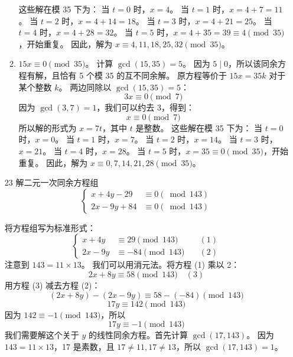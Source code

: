 \begin{enumerate}
\begin{solution}
\begin{enumerate}
            这些解在模 35 下为：
            当 $t=0$ 时，$x = 4$。
            当 $t=1$ 时，$x = 4 + 7 = 11$。
            当 $t=2$ 时，$x = 4 + 14 = 18$。
            当 $t=3$ 时，$x = 4 + 21 = 25$。
            当 $t=4$ 时，$x = 4 + 28 = 32$。
            当 $t=5$ 时，$x = 4 + 35 = 39 \equiv 4 \pmod{35}$，开始重复。
            因此，解为 $x \equiv 4, 11, 18, 25, 32 \pmod{35}$。
            \item $15 x \equiv 0 \pmod{35}$。
            计算 $\gcd(15, 35) = 5$。
            因为 $5 \mid 0$，所以该同余方程有解，且恰有 5 个模 35 的互不同余解。
            原方程等价于 $15x = 35k$ 对于某个整数 $k$。
            两边同除以 $\gcd(15, 35)=5$：
            \[ 3x \equiv 0 \pmod{7} \]
            因为 $\gcd(3, 7) = 1$，我们可以约去 3，得到：
            \[ x \equiv 0 \pmod 7 \]
            所以解的形式为 $x = 7t$，其中 $t$ 是整数。
            这些解在模 35 下为：
            当 $t=0$ 时，$x = 0$。
            当 $t=1$ 时，$x = 7$。
            当 $t=2$ 时，$x = 14$。
            当 $t=3$ 时，$x = 21$。
            当 $t=4$ 时，$x = 28$。
            当 $t=5$ 时，$x = 35 \equiv 0 \pmod{35}$，开始重复。
            因此，解为 $x \equiv 0, 7, 14, 21, 28 \pmod{35}$。
        \end{enumerate}
    \end{solution}
    \item[23] 解二元一次同余方程组
    $$
    \left\{\begin{aligned}
    x+4 y-29 & \equiv 0(\bmod 143) \\
    2 x-9 y+84 & \equiv 0(\bmod 143)
    \end{aligned}\right.
    $$
    \begin{solution}
        将方程组写为标准形式：
        $$
        \left\{\begin{aligned}
        x+4 y & \equiv 29 \pmod{143} \quad &(1) \\
        2 x-9 y & \equiv -84 \pmod{143} \quad &(2)
        \end{aligned}\right.
        $$
        注意到 $143 = 11 \times 13$。
        我们可以用消元法。将方程 (1) 乘以 2：
        \[ 2x + 8y \equiv 58 \pmod{143} \quad (3) \]
        用方程 (3) 减去方程 (2)：
        \[ (2x + 8y) - (2x - 9y) \equiv 58 - (-84) \pmod{143} \]
        \[ 17y \equiv 142 \pmod{143} \]
        因为 $142 \equiv -1 \pmod{143}$，所以
        \[ 17y \equiv -1 \pmod{143} \]
        我们需要解这个关于 $y$ 的线性同余方程。首先计算 $\gcd(17, 143)$。
        因为 $143 = 11 \times 13$，17 是素数，且 $17 \ne 11, 17 \ne 13$，所以 $\gcd(17, 143) = 1$。

\end{solution}
\end{enumerate}
